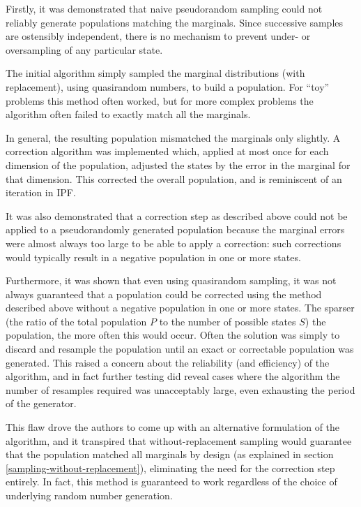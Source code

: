 \documentclass{JASSS}
\begin{document}

Firstly, it was demonstrated that naive pseudorandom sampling could not
reliably generate populations matching the marginals. Since successive
samples are ostensibly independent, there is no mechanism to prevent
under- or oversampling of any particular state.

The initial algorithm simply sampled the marginal distributions (with
replacement), using quasirandom numbers, to build a population. For
``toy'' problems this method often worked, but for more complex problems
the algorithm often failed to exactly match all the marginals.

In general, the resulting population mismatched the marginals only
slightly. A correction algorithm was implemented which, applied at most
once for each dimension of the population, adjusted the states by the
error in the marginal for that dimension. This corrected the overall
population, and is reminiscent of an iteration in IPF.

It was also demonstrated that a correction step as described above could
not be applied to a pseudorandomly generated population because the
marginal errors were almost always too large to be able to apply a
correction: such corrections would typically result in a negative
population in one or more states.

Furthermore, it was shown that even using quasirandom sampling, it was
not always guaranteed that a population could be corrected using the
method described above without a negative population in one or more
states. The sparser (the ratio of the total population \(P\) to the
number of possible states \(S\)) the population, the more often this
would occur. Often the solution was simply to discard and resample the
population until an exact or correctable population was generated. This
raised a concern about the reliability (and efficiency) of the
algorithm, and in fact further testing did reveal cases where the
algorithm the number of resamples required was unacceptably large, even
exhausting the period of the generator.

This flaw drove the authors to come up with an alternative formulation
of the algorithm, and it transpired that without-replacement sampling
would guarantee that the population matched all marginals by design (as
explained in section \ref{sampling-without-replacement}), eliminating the need for the correction step
entirely. In fact, this method is guaranteed to work regardless of the
choice of underlying random number generation.
\end{document}
